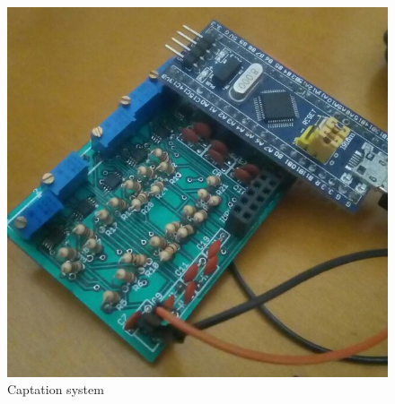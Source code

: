 \begin{figure}[!htpb]
\centering
\caption{Captation system}
\label{HW-pcb}
\includegraphics[scale=0.3]{images/INA/Hw-pcb}
\end{figure}
